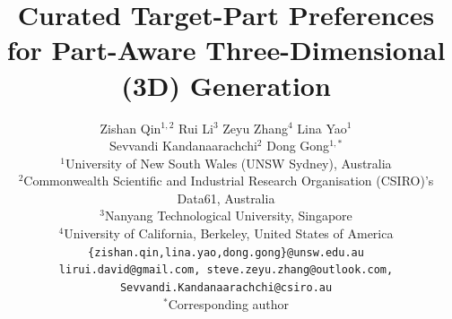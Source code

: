 \documentclass[10pt,twocolumn,letterpaper]{article}
\title{Curated Target-Part Preferences for Part-Aware Three-Dimensional (3D) Generation}
\author{
\begin{tabular}{c}
{\large Zishan Qin$^{1,2}$ \quad Rui Li$^{3}$ \quad Zeyu Zhang$^{4}$ \quad Lina Yao$^{1}$}\\
{\large Sevvandi Kandanaarachchi$^{2}$ \quad Dong Gong$^{1,*}$}\\[2pt]
$^{1}$University of New South Wales (UNSW Sydney), Australia\\
$^{2}$Commonwealth Scientific and Industrial Research Organisation (CSIRO)'s Data61, Australia\\
$^{3}$Nanyang Technological University, Singapore\\
$^{4}$University of California, Berkeley, United States of America\\[2pt]
{\tt\small \{zishan.qin,lina.yao,dong.gong\}@unsw.edu.au}\\
{\tt\small lirui.david@gmail.com, steve.zeyu.zhang@outlook.com, Sevvandi.Kandanaarachchi@csiro.au}\\
{\small $^*$Corresponding author}
\end{tabular}
}
\begin{document}
\maketitle
\begin{abstract}

\end{abstract}
\end{document}
